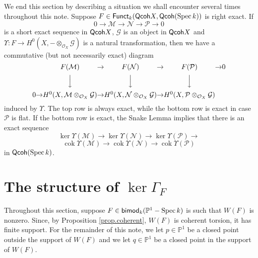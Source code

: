 \documentclass[10pt]{amsart}
\theoremstyle{definition}
\theoremstyle{remark}
\numberwithin{equation}{section}
\begin{document}
We end this section by describing a situation we shall encounter several times throughout this note.  Suppose $F \in {\sf Funct}_{k}({\sf Qcoh }X, {\sf Qcoh }(\operatorname{Spec }k))$ is right exact.  If
\begin{equation} \label{eqn.ses}
0 \rightarrow \mathcal{M} \rightarrow \mathcal{N} \rightarrow \mathcal{P} \rightarrow 0
\end{equation}
is a short exact sequence in ${\sf Qcoh }X$, $\mathcal{G}$ is an object in ${\sf Qcoh }X$ and $\Upsilon:F \rightarrow H^{0}(X,- \otimes_{\mathcal{O}_{X}} \mathcal{G})$ is a natural transformation, then we have a commutative (but not necessarily exact) diagram
\begin{equation} \label{eqn.diag1}
\begin{CD}
& & F(\mathcal{M}) & \rightarrow & F(\mathcal{N}) & \rightarrow & F(\mathcal{P}) & \rightarrow & 0 \\
& & @VVV @VVV @VVV & \\
0 & \rightarrow & H^{0}(X,\mathcal{M} \otimes_{\mathcal{O}_{X}} \mathcal{G}) & \rightarrow & H^{0}(X,\mathcal{N} \otimes_{\mathcal{O}_{X}} \mathcal{G}) & \rightarrow & H^{0}(X,\mathcal{P} \otimes_{\mathcal{O}_{X}} \mathcal{G}) &
\end{CD}
\end{equation}
induced by $\Upsilon$.  The top row is always exact, while the bottom row is exact in case $\mathcal{P}$ is flat.  If the bottom row is exact, the Snake Lemma implies that there is an exact sequence
\begin{equation} \label{eqn.snake}
\operatorname{ker }\Upsilon(\mathcal{M}) \rightarrow \operatorname{ker }\Upsilon (\mathcal{N}) \rightarrow \operatorname{ker }\Upsilon(\mathcal{P}) \rightarrow
\end{equation}
$$\operatorname{cok }\Upsilon(\mathcal{M}) \rightarrow \operatorname{cok }\Upsilon(\mathcal{N}) \rightarrow \operatorname{cok }\Upsilon(\mathcal{P})
$$
in ${\sf Qcoh }(\operatorname{Spec }k)$.

\section{The structure of $\operatorname{ker }\Gamma_{F}$} \label{section.ker}
Throughout this section, suppose $F \in {\sf bimod }_{k}(\mathbb{P}^{1}-\operatorname{Spec }k)$ is such that $W(F)$ is nonzero.  Since, by Proposition \ref{prop.coherent}, $W(F)$ is coherent torsion, it has finite support.  For the remainder of this note, we let $p \in \mathbb{P}^{1}$ be a closed point outside the support of $W(F)$ and we let $q \in \mathbb{P}^{1}$ be a closed point in the support of $W(F)$.
\end{document}
